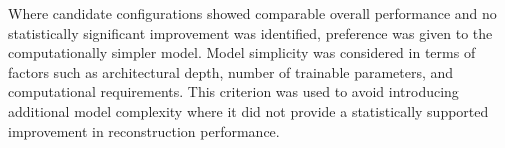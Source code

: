 Where candidate configurations showed comparable overall performance and
no statistically significant improvement was identified, preference was
given to the computationally simpler model. Model simplicity was considered
in terms of factors such as architectural depth, number of trainable
parameters, and computational requirements. This criterion was used to
avoid introducing additional model complexity where it did not provide a
statistically supported improvement in reconstruction performance.
